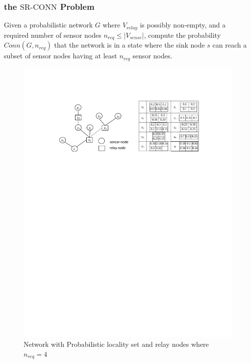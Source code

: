 \documentclass{beamer}
\newcommand{\SRCONN}   { {\mathrm {SR\mbox{-}CONN}} }
\begin{document}

\begin{frame}
\frametitle{the $\SRCONN$ Problem}
\begin{definition}

Given a probabilistic network $G$ where $V_{relay}$ is possibly non-empty, and a required number of sensor nodes $n_{req}\leq |V_{sense}|$, compute the probability $Conn(G,n_{req})$ that the network is in a state where the sink node $s$ can reach a subset of sensor nodes having at least $n_{req}$ sensor nodes. 
\end{definition}

\begin{figure}
\includegraphics[width=4 in, height=1.5 in]{SRCONN.pdf}
\caption{Network with Probabilistic locality set and relay nodes where $n_{req}=4$}
\end{figure}
\end{frame}


\end{document}
